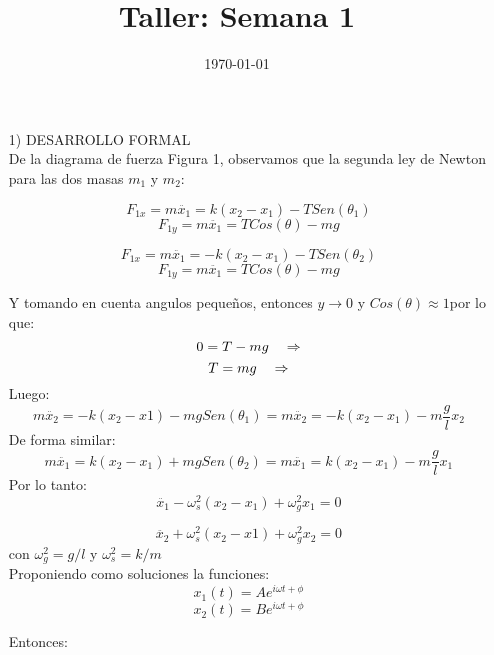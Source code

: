 \documentclass[a4paper]{article}
\date{\today}
\title{Taller: Semana 1}
\begin{document}
    \header{}

    \begin{answer}
    \begin{enumerate}
        \item [1)] DESARROLLO FORMAL\\
            De la diagrama de fuerza Figura 1, observamos que la segunda ley de Newton para las dos masas $m_1$ y $m_2$:
            
            $$F_{1x} = m\ddot{x_1} = k(x_2-x_1) - TSen(\theta_1)$$
            $$F_{1y} = m\ddot{x_1} = TCos(\theta) - mg$$

            $$F_{1x} = m\ddot{x_1} = -k(x_2-x_1) - TSen(\theta_2)$$
            $$F_{1y} = m\ddot{x_1} = TCos(\theta) - mg$$
            
            Y tomando en cuenta angulos pequeños, entonces $y \rightarrow 0$ y $Cos(\theta) \approx 1$por lo que:
                        $$0= T - mg \hspace{0.35cm} \Rightarrow$$
        $$ T =  mg \hspace{0.35cm} \Rightarrow$$
        Luego:
        $$m\ddot{x_2} = -k(x_2-x1) - mgSen(\theta_1) =  m\ddot{x_2} = -k(x_2 - x_1) - m\frac{g}{l}x_2$$
        De forma similar:
        $$m\ddot{x_1} = k(x_2-x_1) + mgSen(\theta_2) =  m\ddot{x_1} = k(x_2 - x_1) - m\frac{g}{l}x_1$$
        Por lo tanto:
        \begin{equation}
            \ddot{x_1} - \omega_s^2(x_2 - x_1) + \omega_g^2 x_1 = 0
        \end{equation}
        
        \begin{equation}
            \ddot{x_2} +  \omega_s^2(x_2-x1) + \omega_g^2 x_2 = 0
        \end{equation}
        con  $\omega_g^2 = g/l$ y $\omega_s^2 = k/m$\\
        Proponiendo como soluciones la funciones:
        \begin{equation}
            x_1(t) = Ae^{i\omega t + \phi}
        \end{equation}
  \begin{equation}
            x_2(t) = Be^{i\omega t + \phi}
        \end{equation}
     
        Entonces:
        

\end{enumerate}
\end{answer}
\end{document}
